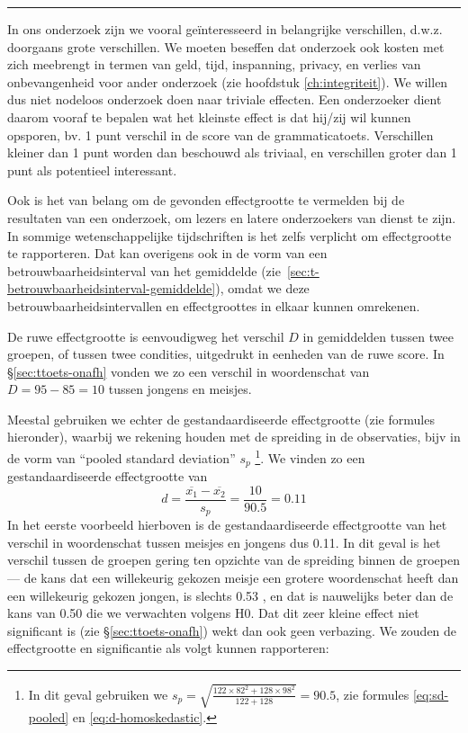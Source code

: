 \documentclass[
]{book}
\begin{document}
\begin{center}\rule{0.5\linewidth}{0.5pt}\end{center}

In ons onderzoek zijn we vooral geïnteresseerd in belangrijke
verschillen, d.w.z. doorgaans grote verschillen. We moeten beseffen dat
onderzoek ook kosten met zich meebrengt in termen van geld, tijd,
inspanning, privacy, en verlies van onbevangenheid voor ander onderzoek
(zie hoofdstuk
\ref{ch:integriteit}). We willen dus niet nodeloos onderzoek doen
naar triviale effecten. Een onderzoeker dient daarom vooraf te bepalen
wat het kleinste effect is dat hij/zij wil kunnen opsporen, bv. 1 punt
verschil in de score van de grammaticatoets. Verschillen kleiner dan 1
punt worden dan beschouwd als triviaal, en verschillen groter dan 1 punt
als potentieel interessant.

Ook is het van belang om de gevonden effectgrootte te vermelden bij de
resultaten van een onderzoek, om lezers en latere onderzoekers van
dienst te zijn. In sommige wetenschappelijke tijdschriften is het zelfs
verplicht om effectgrootte te rapporteren. Dat kan overigens ook in de
vorm van een betrouwbaarheidsinterval van het gemiddelde
(zie~\ref{sec:t-betrouwbaarheidsinterval-gemiddelde}), omdat we deze
betrouwbaarheidsintervallen en effectgroottes in elkaar kunnen
omrekenen.

De ruwe effectgrootte is eenvoudigweg het verschil \(D\) in gemiddelden
tussen twee groepen, of tussen twee condities, uitgedrukt in eenheden
van de ruwe score. In §\ref{sec:ttoets-onafh} vonden we zo een verschil in woordenschat
van \(D=95-85=10\) tussen jongens en meisjes.

Meestal gebruiken we echter de gestandaardiseerde effectgrootte (zie
formules hieronder), waarbij we rekening houden met de spreiding in de
observaties, bijv in de vorm van ``pooled standard deviation'' \(s_p\) \footnote{In dit geval gebruiken we \(s_p = \sqrt{ \frac{122\times82^2+128\times98^2} {122+128} } = 90.5\), zie formules \eqref{eq:sd-pooled} en \eqref{eq:d-homoskedastic}.}.
We vinden zo een gestandaardiseerde effectgrootte van
\[\label{eq:d-standardized}
    d = \frac{ \overline{x_1}-\overline{x_2} } {s_p} = \frac{10}{90.5} = 0.11\]
In het eerste voorbeeld hierboven is de gestandaardiseerde effectgrootte
van het verschil in woordenschat tussen meisjes en jongens dus 0.11. In
dit geval is het verschil tussen de groepen gering ten opzichte van de
spreiding binnen de groepen --- de kans dat een willekeurig gekozen
meisje een grotere woordenschat heeft dan een willekeurig gekozen
jongen, is slechts 0.53 \citep{McGraw92}, en dat is nauwelijks beter dan de
kans van 0.50 die we verwachten volgens H0. Dat dit zeer kleine effect
niet significant is (zie §\ref{sec:ttoets-onafh}) wekt dan ook geen verbazing.
We zouden de
effectgrootte en significantie als volgt kunnen rapporteren:
\end{document}
